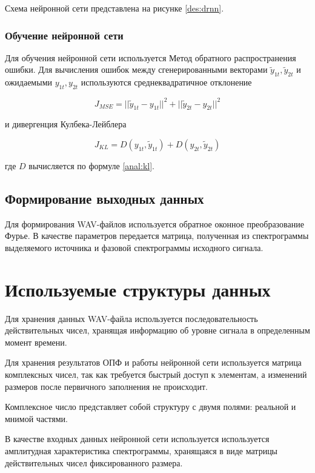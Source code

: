 Схема нейронной сети представлена на рисунке \ref{des:drnn}.

\subsubsection{Обучение нейронной сети}

Для обучения нейронной сети используется Метод обратного распространения ошибки. Для вычисления ошибок между сгенерированными векторами $ \tilde{y}_{1t}, \tilde{y}_{2t} $ и ожидаемыми $ y_{1t}, y_{2t} $ используются среднеквадратичное отклонение

\begin{equation}
J_{MSE} = || \tilde{y}_{1t} - y_{1t} ||^2 + || \tilde{y}_{2t} - y_{2t} ||^2
\end{equation}

и дивергенция Кулбека-Лейблера

\begin{equation}
J_{KL} = D(y_{1t}, \tilde{y}_{1t}) + D(y_{2t}, \tilde{y}_{2t})
\end{equation}

где $D$ вычисляется по формуле \ref{anal:kl}.

\subsection{Формирование выходных данных}

Для формирования WAV-файлов используется обратное оконное преобразование Фурье. В качестве параметров передается матрица, полученная из спектрограммы выделяемого источника и фазовой спектрограммы исходного сигнала.

\section{Используемые структуры данных}

Для хранения данных WAV-файла используется последовательность действительных чисел, хранящая информацию об уровне сигнала в определенным момент времени.

Для хранения результатов ОПФ и работы нейронной сети используется матрица комплексных чисел, так как требуется быстрый доступ к элементам, а изменений размеров после первичного заполнения не происходит. 

Комплексное число представляет собой структуру с двумя полями: реальной и мнимой частями.

В качестве входных данных нейронной сети используется используется амплитудная характеристика спектрограммы, хранящаяся в виде матрицы действительных чисел фиксированного размера.


